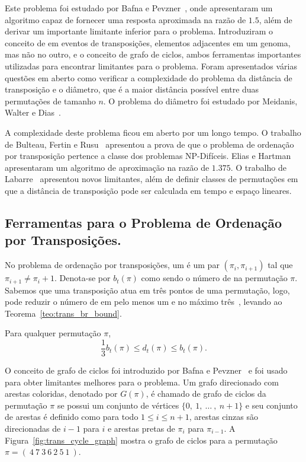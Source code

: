Este problema foi estudado por Bafna e
Pevzner~\cite{BafnaPevzner*1998}, onde apresentaram um algoritmo capaz
de fornecer uma resposta aproximada na razão de $1.5$, além de derivar
um importante limitante inferior para o problema. Introduziram o
conceito de \bkp{} em eventos de transposições, elementos adjacentes
em um genoma, mas não no outro, e o conceito de grafo de ciclos, ambos
ferramentas importantes utilizadas para encontrar limitantes para o
problema. Foram apresentados várias questões em aberto como verificar
a complexidade do problema da distância de transposição e o diâmetro,
que é a maior distância possível entre duas permutações de tamanho
$n$. O problema do diâmetro foi estudado por Meidanis, Walter e
Dias~\cite{MeidanisWalterDias*1997}.

A complexidade deste problema ficou em aberto por um longo tempo. O
trabalho de Bulteau, Fertin e Rusu~\cite{BulteauFertinRusu*2010}
apresentou a prova de que o problema de ordenação por transposição
pertence a classe dos problemas NP-Difíceis. Elias e
Hartman~\cite{EliasHartman*2006} apresentaram um algoritmo de
aproximação na razão de $1.375$. O trabalho de
Labarre~\cite{Labarre*2006} apresentou novos limitantes, além de
definir classes de permutações em que a distância de transposição pode
ser calculada em tempo e espaço lineares.

\subsection{Ferramentas para o Problema de Ordenação por Transposições.}
\label{subsec:tooltra}
No problema de ordenação por transposições, um \bkp{} é um par
$(\pi_{i}, \pi_{i+1})$ tal que $\pi_{i+1} \neq \pi_{i} + 1$. Denota-se
por $b_{t}(\pi)$ como sendo o número de \bkp{} na permutação
$\pi$. Sabemos que uma transposição atua em três pontos de uma
permutação, logo, pode reduzir o número de \bkp{} em pelo menos um e
no máximo três~\cite{BafnaPevzner*1998}, levando ao
Teorema~\ref{teo:trans_br_bound}.

\begin{teo}
  \label{teo:trans_br_bound}
  Para qualquer permutação $\pi$, 
  \[
  \frac{1}{3}b_t(\pi) \leq d_t(\pi) \leq b_t(\pi).
  \]
\end{teo}

O conceito de grafo de ciclos foi introduzido por Bafna e
Pevzner~\cite{BafnaPevzner*1998} e foi usado para obter limitantes
melhores para o problema. Um grafo direcionado com arestas coloridas,
denotado por $G(\pi)$, é chamado de grafo de ciclos da permutação
$\pi$ se possui um conjunto de vértices $\{0,~1,~\ldots~,~n+1\}$ e seu
conjunto de arestas é definido como para todo $1 \leq i \leq n+1$,
arestas cinzas são direcionadas de $i-1$ para $i$ e arestas pretas de
$\pi_{i}$ para $\pi_{i-1}$. A Figura~\ref{fig:trans_cycle_graph}
mostra o grafo de ciclos para a permutação $\pi = (~4~7~3~6~2~5~1~)$.

